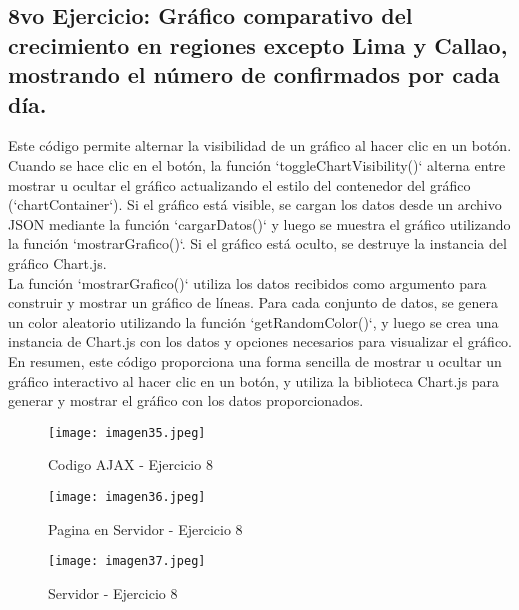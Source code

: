 \documentclass[10pt, a4paper]{article}
\begin{document}
	\subsection*{8vo Ejercicio: Gráfico comparativo del crecimiento en regiones excepto Lima y Callao, mostrando el número de confirmados por cada día.} 
	\begin{flushleft}
		Este código permite alternar la visibilidad de un gráfico al hacer clic en un botón. Cuando se hace clic en el botón, la función `toggleChartVisibility()` alterna entre mostrar u ocultar el gráfico actualizando el estilo del contenedor del gráfico (`chartContainer`). Si el gráfico está visible, se cargan los datos desde un archivo JSON mediante la función `cargarDatos()` y luego se muestra el gráfico utilizando la función `mostrarGrafico()`. Si el gráfico está oculto, se destruye la instancia del gráfico Chart.js.\\	
		La función `mostrarGrafico()` utiliza los datos recibidos como argumento para construir y mostrar un gráfico de líneas. Para cada conjunto de datos, se genera un color aleatorio utilizando la función `getRandomColor()`, y luego se crea una instancia de Chart.js con los datos y opciones necesarios para visualizar el gráfico.\\	
		En resumen, este código proporciona una forma sencilla de mostrar u ocultar un gráfico interactivo al hacer clic en un botón, y utiliza la biblioteca Chart.js para generar y mostrar el gráfico con los datos proporcionados.	
	\end{flushleft}
	\begin{figure}[h]
		\centering
		\texttt{[image: imagen35.jpeg]}
		\caption{Codigo AJAX - Ejercicio 8}
	\end{figure}
	\begin{figure}[h]
		\centering
		\texttt{[image: imagen36.jpeg]}
		\caption{Pagina en Servidor - Ejercicio 8}
	\end{figure}
	\begin{figure}[h]
		\centering
		\texttt{[image: imagen37.jpeg]}
		\caption{Servidor - Ejercicio 8}
	\end{figure}
	\vspace*{50cm}
\end{document}
